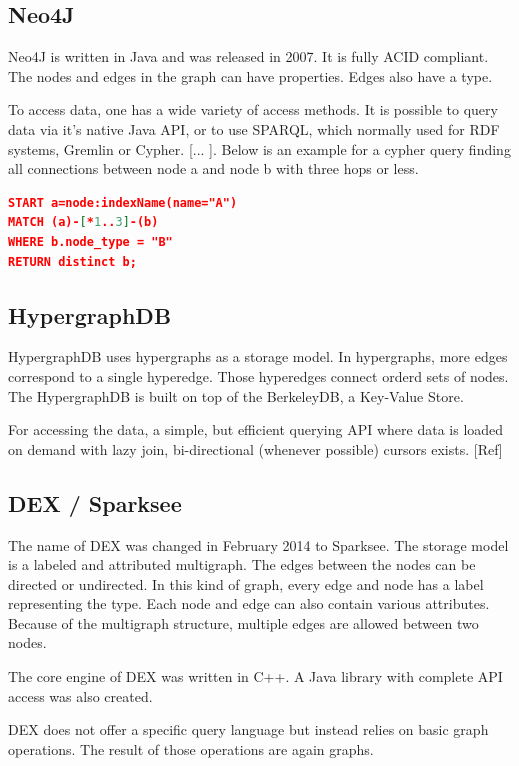 \documentclass{acm_proc_article-sp}
\begin{document}
\subsection{Neo4J}

Neo4J is written in Java and was released in 2007. It is fully ACID compliant. The nodes and edges in the graph can have properties. Edges also have a type. 

To access data, one has a wide variety of access methods. It is possible to query data via it's native Java API, or to use SPARQL, which normally used for RDF systems, Gremlin or Cypher. [... ]. Below is an example for a cypher query finding all connections between node a and node b with three hops or less.

\begin{lstlisting}[language=json,firstnumber=1]
START a=node:indexName(name="A")
MATCH (a)-[*1..3]-(b)
WHERE b.node_type = "B"
RETURN distinct b;
\end{lstlisting}

\subsection{HypergraphDB}

HypergraphDB uses hypergraphs as a storage model. In hypergraphs, more edges correspond to a single hyperedge. Those hyperedges connect orderd sets of nodes. The HypergraphDB is built on top of the BerkeleyDB, a Key-Value Store.

For accessing the data, a simple, but efficient querying
API where data is loaded on demand with lazy join, bi-directional (whenever
possible) cursors exists. [Ref]

\subsection{DEX / Sparksee}

The name of DEX was changed in February 2014 to Sparksee. The storage model is a labeled and attributed multigraph. The edges between the nodes can be directed or undirected. In this kind of graph, every edge and node has a label representing the type. Each node and edge can also contain various attributes. Because of the multigraph structure, multiple edges are allowed between two nodes.

The core engine of DEX was written in C++. A Java library with complete API access was also created. 

DEX does not offer a specific query language but instead relies on basic graph operations. The result of those operations are again graphs.
\end{document}
